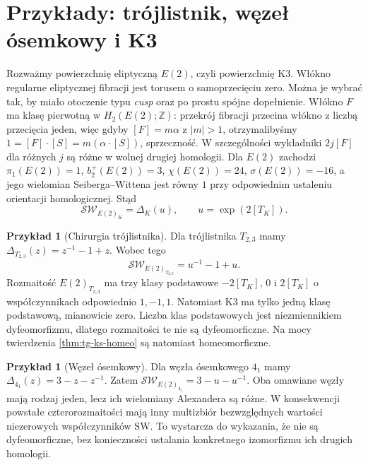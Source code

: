 \documentclass[11pt,a4paper]{report}
\numberwithin{equation}{section}
\theoremstyle{plain}
\theoremstyle{definition}
\newtheorem{przyklad}[twierdzenie]{Przykład}
\theoremstyle{remark}
\begin{document}
\section{Przykłady: trójlistnik, węzeł ósemkowy i K3}
\label{sec:tg-ks-examples}

Rozważmy powierzchnię eliptyczną $E(2)$,
czyli powierzchnię K3. Włókno regularne
eliptycznej fibracji jest torusem o samoprzecięciu
zero. Można je wybrać tak, by miało otoczenie typu
\emph{cusp} oraz po prostu spójne dopełnienie.
Włókno $F$ ma klasę pierwotną w
$H_2(E(2);\mathbb Z)$: przekrój fibracji przecina
włókno z liczbą przecięcia jeden, więc gdyby
$[F]=m\alpha$ z $|m|>1$, otrzymalibyśmy
$1=[F]\cdot[S]=m(\alpha\cdot[S])$, sprzeczność.
W szczególności wykładniki $2j[F]$ dla różnych $j$
są różne w wolnej drugiej homologii.
Dla $E(2)$ zachodzi
$\pi_1(E(2))=1$, $b_2^+(E(2))=3$,
$\chi(E(2))=24$, $\sigma(E(2))=-16$, a jego
wielomian Seiberga--Wittena jest równy $1$ przy
odpowiednim ustaleniu orientacji homologicznej.
Stąd
\[
\mathcal{SW}_{E(2)_K}=\Delta_K(u),
\qquad u=\exp(2[T_K]).
\]

\begin{przyklad}[Chirurgia trójlistnika]
Dla trójlistnika $T_{2,3}$ mamy
$\Delta_{T_{2,3}}(z)=z^{-1}-1+z$. Wobec tego
\[
\mathcal{SW}_{E(2)_{T_{2,3}}}=u^{-1}-1+u.
\]
Rozmaitość $E(2)_{T_{2,3}}$ ma trzy klasy podstawowe
$-2[T_K]$, $0$ i $2[T_K]$ o współczynnikach
odpowiednio $1,-1,1$. Natomiast K3 ma tylko
jedną klasę podstawową, mianowicie zero.
Liczba klas podstawowych jest niezmiennikiem
dyfeomorfizmu, dlatego rozmaitości te nie są
dyfeomorficzne. Na mocy twierdzenia
\ref{thm:tg-ks-homeo} są natomiast homeomorficzne.
\end{przyklad}

\begin{przyklad}[Węzeł ósemkowy]
Dla węzła ósemkowego $4_1$ mamy
$\Delta_{4_1}(z)=3-z-z^{-1}$.
Zatem
$\mathcal{SW}_{E(2)_{4_1}}=3-u-u^{-1}$.
Oba omawiane węzły mają rodzaj jeden, lecz
ich wielomiany Alexandera są różne.
W konsekwencji powstałe czterorozmaitości mają
inny multizbiór bezwzględnych wartości niezerowych
współczynników SW. To wystarcza do wykazania,
że nie są dyfeomorficzne, bez konieczności ustalania
konkretnego izomorfizmu ich drugich homologii.
\end{przyklad}
\end{document}
